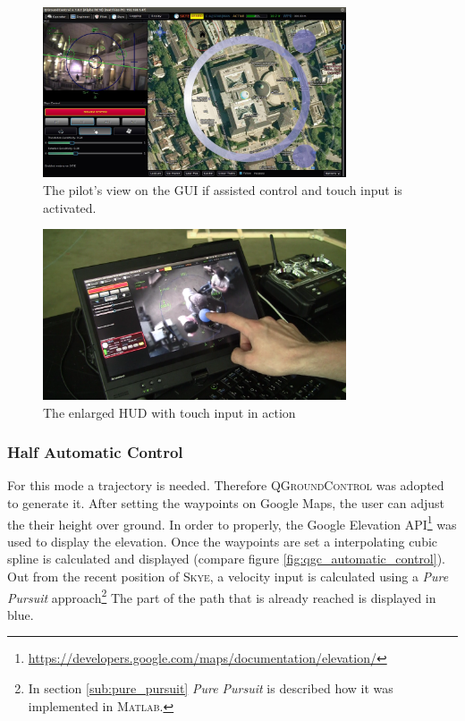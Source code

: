 \begin{figure}[H] %
	\begin{center}
		\includegraphics[width=0.8\textwidth]{qgc_manual_control}
		\caption{The pilot's view on the GUI if assisted  control and touch input is activated.}  
		\label{fig:qgc_manual_control}		
	\end{center}
\end{figure}

\begin{figure}[H] %
	\begin{center}
		\includegraphics[width=0.8\textwidth]{graphics/TouchInput}
		\caption{The enlarged HUD with touch input in action}  
		\label{fig:touchInput}		
	\end{center}
\end{figure}


\subsubsection{Half Automatic Control}
\label{subsub:halfautomaticcontrol}
For this mode a trajectory is needed. Therefore \textsc{QGroundControl} was adopted to generate it. After setting the waypoints on Google Maps, the user can adjust the their height over ground. In order to properly, the Google Elevation API\footnote{\url{https://developers.google.com/maps/documentation/elevation/}} was used to display the elevation. Once the waypoints are set a interpolating cubic spline is calculated and displayed (compare figure \ref{fig:qgc_automatic_control}). Out from the recent position of \textsc{Skye}, a velocity input is calculated using a \textit{Pure Pursuit} approach\footnote{In section \ref{sub:pure_pursuit} \textit{Pure Pursuit} is described how it was implemented in \textsc{Matlab}.} The part of the path that is already reached is displayed in blue. %

